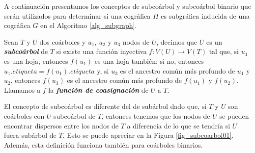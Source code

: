 A continuación presentamos los conceptos de subcoárbol y subcoárbol binario que
serán utilizados para determinar si una cográfica $H$ es subgráfica inducida de
una cográfica $G$ en el Algoritmo \ref{alg_subgraph}.

\begin{definition}
    Sean $T$ y $U$ dos coárboles y $u_1$, $u_2$ y $u_3$ nodos de $U$, decimos
    que $U$ es un \emph{\textbf{subcoárbol}} de $T$ si existe una función
    inyectiva $f:V(U)\rightarrow V(T)$ tal que, si $u_1$ es una hoja, entonces
    $f(u_1)$ es una hoja también; si no, entonces $u_1.etiqueta =
    f(u_1).etiqueta$ y, si $u_3$ es el ancestro común más profundo de $u_1$ y
    $u_2$, entonces $f(u_3)$ es el ancestro común más profundo de $f(u_1)$ y
    $f(u_2)$. Llamamos a $f$ la \textbf{\emph{función de coasignación}} de $U$ a
    $T$.
\end{definition}

El concepto de subcoárbol es diferente del de subárbol dado que, si $T$ y $U$
son coárboles con $U$ subcoárbol de $T$, entonces tenemos que los nodos de $U$
se pueden encontrar dispersos entre los nodos de $T$ a diferencia de lo que se
tendría si $U$ fuera subárbol de $T$. Esto se puede apreciar en la Figura
\ref{fig_subcoarbol01}. Además, esta definición funciona también para coárboles
binarios.


